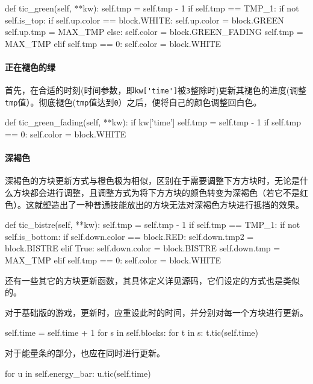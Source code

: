 \documentclass[UTF8]{article}
\begin{document}
\begin{python}
def tic_green(self, **kw):
    self.tmp = self.tmp - 1
    if self.tmp == TMP_1:
        if not self.is_top:
            if self.up.color == block.WHITE:
                self.up.color = block.GREEN
                self.up.tmp   = MAX_TMP
            else:
                self.color = block.GREEN_FADING
                self.tmp = MAX_TMP
    elif self.tmp == 0:
        self.color = block.WHITE
\end{python}

\paragraph{正在褪色的绿} 首先，在合适的时刻(时间参数，即\verb|kw['time']|被\texttt{3}整除时)更新其褪色的进度(调整\texttt{tmp}值）。彻底褪色(\texttt{tmp}值达到\texttt{0}）之后，便将自己的颜色调整回白色。

\begin{python}
def tic_green_fading(self, **kw):
    if kw['time'] %
        self.tmp = self.tmp - 1
    if self.tmp == 0:
        self.color = block.WHITE
\end{python}

\paragraph{深褐色} 深褐色的方块更新方式与橙色极为相似，区别在于需要调整下方方块时，无论是什么方块都会进行调整，且调整方式为将下方方块的颜色转变为深褐色（若它不是红色）。这就塑造出了一种普通技能放出的方块无法对深褐色方块进行抵挡的效果。

\begin{python}
def tic_bistre(self, **kw):
    self.tmp = self.tmp - 1
    if self.tmp == TMP_1:
        if not self.is_bottom:
            if self.down.color == block.RED:
                self.down.tmp2 = block.BISTRE
            elif True:
                self.down.color = block.BISTRE
                self.down.tmp   = MAX_TMP
    elif self.tmp == 0:
        self.color = block.WHITE
\end{python}

还有一些其它的方块更新函数，其具体定义详见源码，它们设定的方式也是类似的。

对于基础版的游戏，更新时，应重设此时的时间，并分别对每一个方块进行更新。
\begin{python}
        self.time = self.time + 1
        for s in self.blocks:
            for t in s:
                t.tic(self.time)
\end{python}
对于能量条的部分，也应在同时进行更新。
\begin{python}
        for u in self.energy_bar:
            u.tic(self.time)
\end{python}
\end{document}
